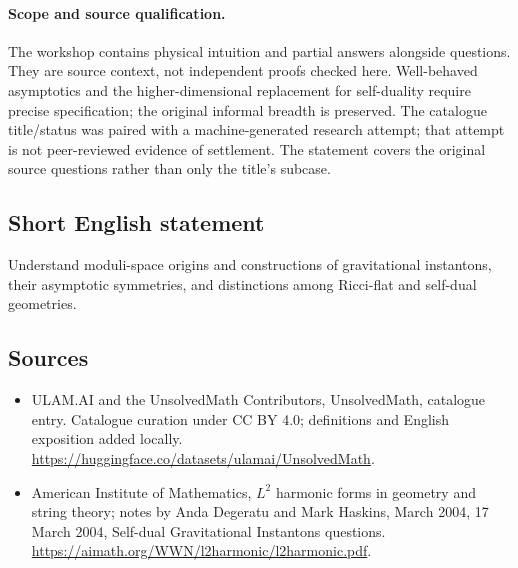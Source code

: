 \documentclass[11pt]{article}
\begin{document}
\paragraph{Scope and source qualification.}The workshop contains physical intuition and partial answers alongside questions. They are source context, not independent proofs checked here. Well-behaved asymptotics and the higher-dimensional replacement for self-duality require precise specification; the original informal breadth is preserved. The catalogue title/status was paired with a machine-generated research attempt; that attempt is not peer-reviewed evidence of settlement. The statement covers the original source questions rather than only the title’s subcase.
\subsection{Short English statement}
Understand moduli-space origins and constructions of gravitational instantons, their asymptotic symmetries, and distinctions among Ricci-flat and self-dual geometries.
\subsection{Sources}
\begin{itemize}
\item[\hypertarget{source:statement:1}{S1}] ULAM.AI and the UnsolvedMath Contributors, UnsolvedMath, catalogue entry. Catalogue curation under CC BY 4.0; definitions and English exposition added locally.
\url{https://huggingface.co/datasets/ulamai/UnsolvedMath}.
\item[\hypertarget{source:statement:2}{S2}] American Institute of Mathematics, $L^2$ harmonic forms in geometry and string theory; notes by Anda Degeratu and Mark Haskins, March 2004, 17 March 2004, Self-dual Gravitational Instantons questions.
\url{https://aimath.org/WWN/l2harmonic/l2harmonic.pdf}.
\end{itemize}
\label{end:statement}
\end{document}
